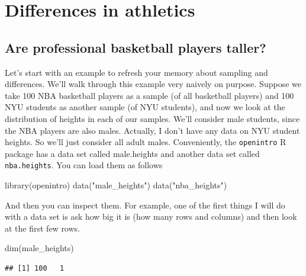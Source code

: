\documentclass[
  openany]{book}
\newenvironment{Shaded}{\begin{snugshade}}{\end{snugshade}}
\newcommand{\FunctionTok}[1]{\textcolor[rgb]{0.00,0.00,0.00}{#1}}
\newcommand{\NormalTok}[1]{#1}
\newcommand{\StringTok}[1]{\textcolor[rgb]{0.31,0.60,0.02}{#1}}
\begin{document}
\hypertarget{differences-in-athletics}{%
\chapter{Differences in athletics}\label{differences-in-athletics}}

\hypertarget{are-professional-basketball-players-taller}{%
\section*{Are professional basketball players taller?}\label{are-professional-basketball-players-taller}}

Let's start with an example to refresh your memory about sampling and differences. We'll walk through this example very naively on purpose. Suppose we take 100 NBA basketball players as a sample (of all basketball players) and 100 NYU students as another sample (of NYU students), and now we look at the distribution of heights in each of our samples. We'll consider male students, since the NBA players are also males. Actually, I don't have any data on NYU student heights. So we'll just consider all adult males. Conveniently, the \texttt{openintro} R package has a data set called male.heights and another data set called \texttt{nba.heights}. You can load them as follows

\begin{Shaded}
\begin{Highlighting}[]
\FunctionTok{library}\NormalTok{(openintro)}
\FunctionTok{data}\NormalTok{(}\StringTok{"male\_heights"}\NormalTok{)}
\FunctionTok{data}\NormalTok{(}\StringTok{"nba\_heights"}\NormalTok{)}
\end{Highlighting}
\end{Shaded}

And then you can inspect them. For example, one of the first things I will do with a data set is ask how big it is (how many rows and columns) and then look at the first few rows.

\begin{Shaded}
\begin{Highlighting}[]
\FunctionTok{dim}\NormalTok{(male\_heights)}
\end{Highlighting}
\end{Shaded}

\begin{verbatim}
## [1] 100   1
\end{verbatim}
\end{document}
